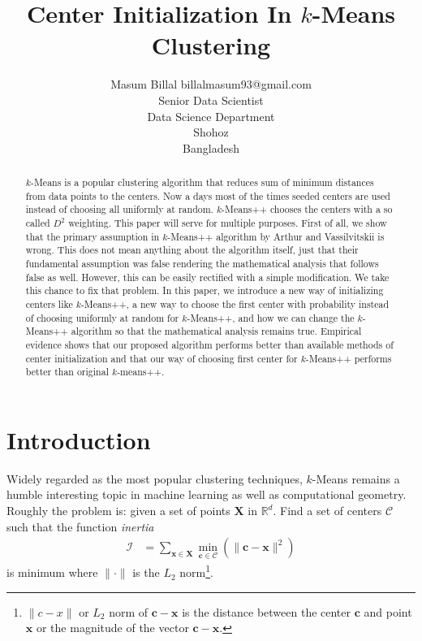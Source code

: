 \documentclass[twoside, 11pt]{article}
\title{Center Initialization In $k$-Means Clustering}
\author{\name Masum Billal \email billalmasum93@gmail.com \\
	Senior Data Scientist\\
	\addr Data Science Department\\
	Shohoz\\
	Bangladesh}
\newcommand{\x}{\mathbf{x}}
\newcommand{\X}{\mathbf{X}}
\renewcommand{\c}{\mathbf{c}}
\newcommand{\C}{\mathcal{C}}
\begin{document}
	
	\maketitle
		\begin{abstract}%
			$k$-Means is a popular clustering algorithm that reduces sum of minimum distances from data points to the centers. Now a days most of the times seeded centers are used instead of choosing all uniformly at random. $k$-Means++ chooses the centers with a so called $D^2$ weighting. This paper will serve for multiple purposes. First of all, we show that the primary assumption in $k$-Means++ algorithm by Arthur and Vassilvitskii is wrong. This does not mean anything about the algorithm itself, just that their fundamental assumption was false rendering the mathematical analysis that follows false as well. However, this can be easily rectified with a simple modification. We take this chance to fix that problem. In this paper, we introduce a new way of initializing centers like $k$-Means++, a new way to choose the first center with probability instead of choosing uniformly at random for $k$-Means++, and how we can change the $k$-Means++ algorithm so that the mathematical analysis remains true. Empirical evidence shows that our proposed algorithm performs better than available methods of center initialization and that our way of choosing first center for $k$-Means++ performs better than original $k$-means++.
		\end{abstract}
	\section{Introduction}
	Widely regarded as the most popular clustering techniques, $k$-Means remains a humble interesting topic in machine learning as well as computational geometry. Roughly the problem is: given a set of points $\X$ in $\mathbb{R}^d$. Find a set of centers $\mathcal{C}$ such that the function \textit{inertia}
		\begin{align*}
			\mathcal{I} & = \sum_{\x\in\X}\min_{\c\in\C}(\|\c-\x\|^2)
		\end{align*}
	is minimum where $\|\cdot\|$ is the $L_2$ norm\footnote{$\|c-x\|$ or $L_2$ norm of $\c-\x$ is the distance between the center $\c$ and point $\x$ or the magnitude of the vector $\c-\x$.}.
	
\end{document}
